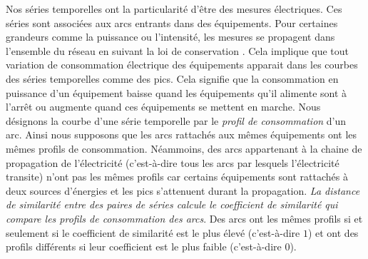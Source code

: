 Nos s\'eries temporelles ont la particularit\'e d'\^etre des mesures \'electriques. Ces s\'eries sont associ\'ees aux arcs entrants dans des \'equipements. Pour certaines grandeurs comme la puissance ou l'intensit\'e, les mesures se propagent dans l'ensemble du r\'eseau en suivant la loi de conservation \cite{loiDeConservation}. Cela implique que tout variation de consommation \'electrique des \'equipements apparait dans les courbes des s\'eries temporelles comme des pics. Cela signifie que la consommation en puissance d'un \'equipement
 baisse quand les \'equipements qu'il alimente sont \`a l'arr\^et ou 
 augmente quand ces \'equipements se mettent en marche.
Nous d\'esignons la courbe d'une s\'erie temporelle par le {\em profil de consommation} d'un arc. 
Ainsi nous supposons que les arcs rattach\'es aux m\^emes \'equipements ont les m\^emes profils de consommation.
N\'eammoins, des arcs appartenant \`a la chaine de propagation de l'\'electricit\'e (c'est-\`a-dire tous les arcs par lesquels l'\'electricit\'e transite) n'ont pas les m\^emes profils car certains \'equipements sont rattach\'es \`a deux sources d'\'energies et les pics s'attenuent durant la propagation.
{\em La distance de similarit\'e entre des paires de s\'eries calcule le coefficient de similarit\'e qui compare les profils de consommation des arcs}. Des arcs ont les m\^emes profils  si et seulement si le coefficient de similarit\'e est le plus \'elev\'e (c'est-\`a-dire $1$) et ont des profils diff\'erents si  leur coefficient est le plus faible (c'est-\`a-dire $0$).
\newline

